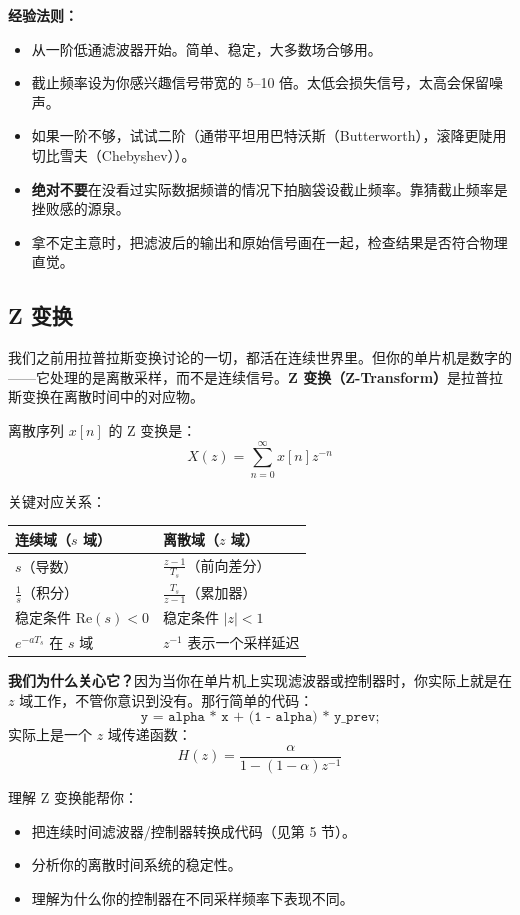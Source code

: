 \documentclass[UTF8]{ctexart}
\begin{document}
\textbf{经验法则：}
\begin{itemize}
    \item 从一阶低通滤波器开始。简单、稳定，大多数场合够用。
    \item 截止频率设为你感兴趣信号带宽的 5--10 倍。太低会损失信号，太高会保留噪声。
    \item 如果一阶不够，试试二阶（通带平坦用巴特沃斯（Butterworth），滚降更陡用切比雪夫（Chebyshev））。
    \item \textbf{绝对不要}在没看过实际数据频谱的情况下拍脑袋设截止频率。靠猜截止频率是挫败感的源泉。
    \item 拿不定主意时，把滤波后的输出和原始信号画在一起，检查结果是否符合物理直觉。
\end{itemize}

\subsection{Z 变换}

我们之前用拉普拉斯变换讨论的一切，都活在连续世界里。但你的单片机是数字的——它处理的是离散采样，而不是连续信号。\textbf{Z 变换（Z-Transform）}是拉普拉斯变换在离散时间中的对应物。

离散序列 $x[n]$ 的 Z 变换是：
\begin{equation}
X(z) = \sum_{n=0}^{\infty} x[n] z^{-n}
\end{equation}

关键对应关系：
\begin{center}
\begin{tabular}{ll}
\toprule
\textbf{连续域（$s$ 域）} & \textbf{离散域（$z$ 域）} \\
\midrule
$s$（导数） & $\frac{z-1}{T_s}$（前向差分） \\
$\frac{1}{s}$（积分） & $\frac{T_s}{z-1}$（累加器） \\
稳定条件 $\text{Re}(s) < 0$ & 稳定条件 $|z| < 1$ \\
$e^{-aT_s}$ 在 $s$ 域 & $z^{-1}$ 表示一个采样延迟 \\
\bottomrule
\end{tabular}
\end{center}

\textbf{我们为什么关心它？}因为当你在单片机上实现滤波器或控制器时，你实际上就是在 $z$ 域工作，不管你意识到没有。那行简单的代码：
\[
\texttt{y = alpha * x + (1 - alpha) * y\_prev;}
\]
实际上是一个 $z$ 域传递函数：
\[
H(z) = \frac{\alpha}{1 - (1-\alpha)z^{-1}}
\]

理解 Z 变换能帮你：
\begin{itemize}
    \item 把连续时间滤波器/控制器转换成代码（见第 5 节）。
    \item 分析你的离散时间系统的稳定性。
    \item 理解为什么你的控制器在不同采样频率下表现不同。
\end{itemize}
\end{document}
